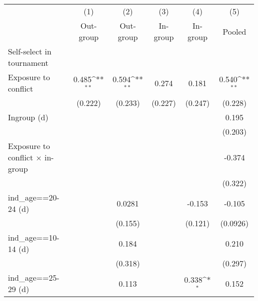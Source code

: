 {
\def\sym#1{\ifmmode^{#1}\else\(^{#1}\)\fi}
\begin{tabular}{l*{5}{c}}
\hline\hline
                    &\multicolumn{1}{c}{(1)}&\multicolumn{1}{c}{(2)}&\multicolumn{1}{c}{(3)}&\multicolumn{1}{c}{(4)}&\multicolumn{1}{c}{(5)}\\
                    &\multicolumn{1}{c}{Out-group}&\multicolumn{1}{c}{Out-group}&\multicolumn{1}{c}{In-group}&\multicolumn{1}{c}{In-group}&\multicolumn{1}{c}{Pooled}\\
\hline
Self-select in tournament&                     &                     &                     &                     &                     \\
Exposure to conflict&       0.485\sym{**} &       0.594\sym{**} &       0.274         &       0.181         &       0.540\sym{**} \\
                    &     (0.222)         &     (0.233)         &     (0.227)         &     (0.247)         &     (0.228)         \\
[1em]
Ingroup (d)         &                     &                     &                     &                     &       0.195         \\
                    &                     &                     &                     &                     &     (0.203)         \\
[1em]
Exposure to conflict × in-group&                     &                     &                     &                     &      -0.374         \\
                    &                     &                     &                     &                     &     (0.322)         \\
[1em]
ind\_age==20-24 (d)  &                     &      0.0281         &                     &      -0.153         &      -0.105         \\
                    &                     &     (0.155)         &                     &     (0.121)         &    (0.0926)         \\
[1em]
ind\_age==10-14 (d)  &                     &       0.184         &                     &                     &       0.210         \\
                    &                     &     (0.318)         &                     &                     &     (0.297)         \\
[1em]
ind\_age==25-29 (d)  &                     &       0.113         &                     &       0.338\sym{*}  &       0.152         \\

\end{tabular}}
